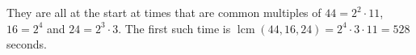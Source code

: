 They are all at the start at times that are common multiples of $44=2^2\cdot11$, $16=2^4$ and $24=2^3\cdot3$. The first such time is $\operatorname{lcm}(44,16,24)=2^4\cdot3\cdot11=\boxed{528}$ seconds.

